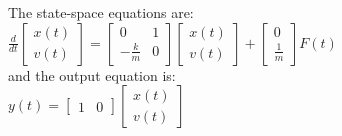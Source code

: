 \documentclass{article}
\begin{document}
    The state-space equations are:\\
    \begin{math}
        \frac{d}{dt} \begin{bmatrix} x(t) \\ v(t) \end{bmatrix} = \begin{bmatrix} 0 & 1 \\ -\frac{k}{m} & 0 \end{bmatrix} \begin{bmatrix} x(t) \\ v(t) \end{bmatrix} + \begin{bmatrix} 0 \\ \frac{1}{m} \end{bmatrix} F(t)
    \end{math}\\
    and the output equation is:\\
    \begin{math}
        y(t) = \begin{bmatrix} 1 & 0 \end{bmatrix} \begin{bmatrix} x(t) \\ v(t) \end{bmatrix}
    \end{math}
\end{document}
